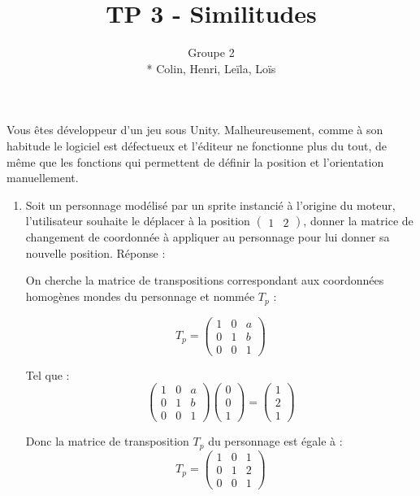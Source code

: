 \documentclass[a4paper,12pt]{article}
\title{TP 3 - Similitudes}
\author{Groupe 2 \\* Colin, Henri, Leïla, Loïs}
\begin{document}
\maketitle

Vous êtes développeur d'un jeu sous Unity. Malheureusement, comme à son habitude le logiciel est défectueux et l'éditeur ne fonctionne plus du tout, de même que les fonctions qui permettent de définir la position et l'orientation manuellement. 
\begin{enumerate}
    \item Soit un personnage modélisé par un sprite instancié à l'origine du moteur, l'utilisateur souhaite le déplacer à la position $\begin{pmatrix} 1 & 2\end{pmatrix}$, donner la matrice de changement de coordonnée à appliquer au personnage pour lui donner sa nouvelle position.\label{exo:1.1}\newline \newline
Réponse :

On cherche la matrice de transpositions correspondant aux coordonnées homogènes mondes du personnage et nommée $T_p$ : 

\[
T_p = 
\begin{pmatrix}
1 & 0 & a \\
0 & 1 & b \\
0 & 0 & 1
\end{pmatrix}\]

Tel que : 
\[\begin{pmatrix}
1 & 0 & a \\
0 & 1 & b \\
0 & 0 & 1
\end{pmatrix}
\begin{pmatrix}
0 \\
0 \\
1 
\end{pmatrix}
=
\begin{pmatrix}
1 \\
2 \\
1
\end{pmatrix}\]

Donc la matrice de transposition $T_p$ du personnage est égale à :
\[\boxed{
T_p = 
\begin{pmatrix}
1 & 0 & 1 \\
0 & 1 & 2 \\
0 & 0 & 1
\end{pmatrix}}\] \newline


\end{enumerate}
\end{document}
